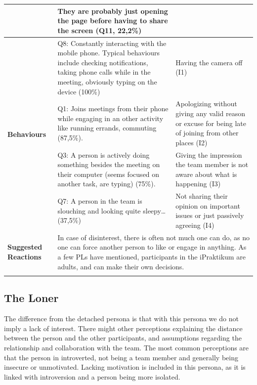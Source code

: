 \begin{longtable}[ht]{ p{}  p{} p{} }
 	 & They are probably just opening the page before having to share the screen (Q11, 22,2\%) \\
    \hline
    \multirow{4}{3cm}{\textbf{Behaviours}}  & Q8: Constantly interacting with the mobile phone. Typical behaviours include checking notifications, taking phone calls while in the meeting, obviously typing on the device (100\%) & Having the camera off (I1) \\
     &  Q1: Joins meetings from their phone while engaging in an other activity like running errands, commuting (87,5\%).  & Apologizing without giving any valid reason or excuse for being late of joining from other places  (I2) \\
     & Q3: A person is actively doing something besides the meeting on their computer (seems focused on another task, are typing) (75\%). & Giving the impression the team member is not aware about what is happening (I3) \\
 	 & Q7: A person in the team is slouching and looking quite sleepy… (37,5\%) & Not sharing their opinion on important issues or just passively agreeing (I4) \\
    \hline
     \textbf{Suggested Reactions} & \multicolumn{2}{p{.80\textwidth}}{In case of disinterest, there is often not much one can do, as no one can force another person to like or engage in anything. As a few PLs have mentioned, participants in the iPraktikum are adults, and can make their own decisions.} \\
    \hline
\label{tab:multicol}
\end{longtable}

\subsection{The Loner}

The difference from the detached persona is that with this persona we do not imply a lack of interest. There might other perceptions explaining the distance between the person and the other participants, and assumptions regarding the relationship and collaboration with the team. The most common perceptions are that the person in introverted, not being a team member and generally being insecure or unmotivated. Lacking motivation is included in this persona, as it is linked with introversion and a person being more isolated. 

